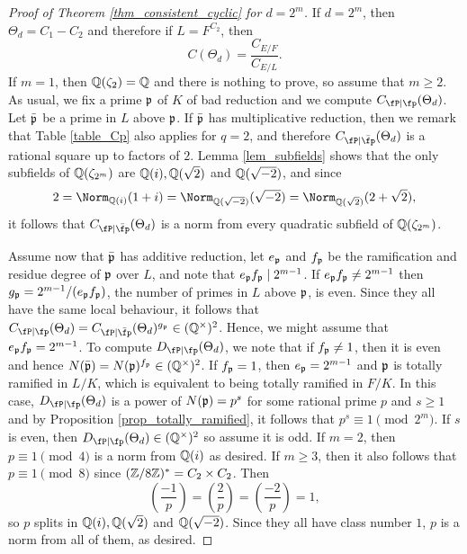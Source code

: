 \begin{proof}[Proof of Theorem \ref{thm_consistent_cyclic} for $d=2^m$]
    If $d=2^m$, then $\Theta_{d}=C_1-C_2$ and therefore if $L=F^{C_2}$, then 
    $$C(\Theta_{d})=\frac{C_{E/F}}{C_{E/L}}.$$
    If $m=1$, then $\mathbb{Q}(\zeta_2)=\mathbb{Q}$ and there is nothing to prove, so assume that $m\geq2$. As usual, we fix a prime $\mathfrak{p}$ of $K$ of bad reduction and we compute $\Cp(\Theta_d)$. Let $\bar{\mathfrak{p}}$ be a prime in $L$ above $\mathfrak{p}$. If $\bar{\mathfrak{p}}$ has multiplicative reduction, then we remark that Table \ref{table_Cp} also applies for $q=2$, and therefore $\Cpb(\Theta_d)$ is a rational square up to factors of $2$. Lemma \ref{lem_subfields} shows that the only subfields of $\mathbb{Q}(\zeta_{2^m})$ are $\mathbb{Q}(i),\mathbb{Q}(\sqrt{2})$ and $\mathbb{Q}(\sqrt{-2})$, and since
    $$2=\Norm_{\QQ(i)}(1+i)=\Norm_{\QQ(\sqrt{-2})}(\sqrt{-2})=\Norm_{\QQ(\sqrt{2})}(2+\sqrt{2}),$$
    it follows that $\Cpb(\Theta_d)$ is a norm from every quadratic subfield of $\mathbb{Q}(\zeta_{2^m})$.

    Assume now that $\bar{\mathfrak{p}}$ has additive reduction, let $e_{\mathfrak{p}}$ and $f_{\mathfrak{p}}$ be the ramification and residue degree of $\mathfrak{p}$ over $L$, and note that $e_{\mathfrak{p}} f_{\mathfrak{p}}\mid 2^{m-1}$. If $e_{\mathfrak{p}} f_{\mathfrak{p}}\neq 2^{m-1}$ then $g_{\mathfrak{p}}=2^{m-1}/(e_{\mathfrak{p}} f_{\mathfrak{p}})$, the number of primes in $L$ above $\mathfrak{p}$, is even. Since they all have the same local behaviour, it follows that $\Cp(\Theta_d)=\Cpb(\Theta_d)^{g_\pp}\in\QQss$. Hence, we might assume that $e_{\mathfrak{p}} f_{\mathfrak{p}}=2^{m-1}$. To compute $\Dp(\Theta_d)$, we note that if $f_{\mathfrak{p}}\neq 1$, then it is even and hence $N(\bar{\mathfrak{p}})=N(\mathfrak{p})^{f_{\mathfrak{p}}}\in(\mathbb{Q}^{\times})^2$. If $f_{\mathfrak{p}}=1$, then $e_{\mathfrak{p}}=2^{m-1}$ and $\mathfrak{p}$ is totally ramified in $L/K$, which is equivalent to being totally ramified in $F/K$. In this case, $\Dp(\Theta_d)$ is a power of $N(\mathfrak{p})=p^s$ for some rational prime $p$ and $s\geq 1$ and by Proposition \ref{prop_totally_ramified}, it follows that $p^s\equiv 1\pmod{2^m}$. If $s$ is even, then $\Dp(\Theta_d)\in\QQss$ so assume it is odd. If $m=2$, then $p\equiv 1\pmod{4}$ is a norm from $\mathbb{Q}(i)$ as desired. If $m\geq 3$, then it also follows that $p\equiv 1\pmod{8}$ since $(\mathbb{Z}/8\mathbb{Z})^*=C_2\times C_2$. Then
    $$\left(\frac{-1}{p}\right)=\left(\frac{2}{p}\right)=\left(\frac{-2}{p}\right)=1,$$
    so $p$ splits in $\mathbb{Q}(i),\mathbb{Q}(\sqrt{2})$ and $\mathbb{Q}(\sqrt{-2})$. Since they all have class number $1$, $p$ is a norm from all of them, as desired.


\end{proof}
